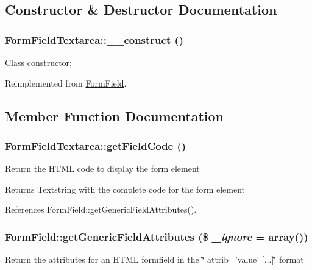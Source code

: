 \subsection{Constructor \& Destructor Documentation}
\subsubsection[{\_\-\_\-construct}]{\setlength{\rightskip}{0pt plus 5cm}FormFieldTextarea::\_\-\_\-construct ()}\label{classFormFieldTextarea_a65e5d308db60f1ca0d08085d09dea8bc}
Class constructor; 

Reimplemented from \hyperlink{classFormField_a0cfe713ce28a6a0cb53476ed463e1f01}{FormField}.



\subsection{Member Function Documentation}
\subsubsection[{getFieldCode}]{\setlength{\rightskip}{0pt plus 5cm}FormFieldTextarea::getFieldCode ()}\label{classFormFieldTextarea_aebe84c54cafbcc8b4fc32f4b5ce04f1a}
Return the HTML code to display the form element

\begin{DoxyReturn}{Returns}
Textstring with the complete code for the form element 
\end{DoxyReturn}


References FormField::getGenericFieldAttributes().

\subsubsection[{getGenericFieldAttributes}]{\setlength{\rightskip}{0pt plus 5cm}FormField::getGenericFieldAttributes (\$ {\em \_\-ignore} = {\ttfamily array()})}\label{classFormField_a9f9d136ba8b4a793f22370aff43d592d}
Return the attributes for an HTML formfield in the \char`\"{} attrib='value' \mbox{[}...\mbox{]}\char`\"{} format


